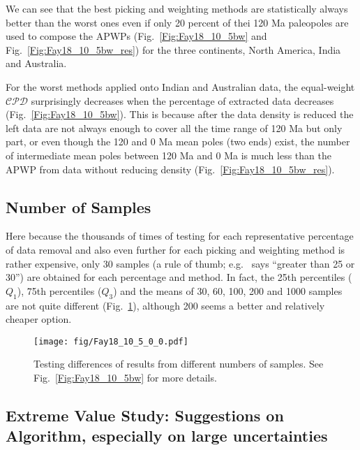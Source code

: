 We can see that the best picking and weighting methods are statistically always
better than the worst ones even if only 20 percent of thei 120 Ma
paleopoles are used to compose the APWPs (Fig.~\ref{Fig:Fay18_10_5bw} and
Fig.~\ref{Fig:Fay18_10_5bw_res}) for the three continents, North America, India
and Australia.

For the worst methods applied onto Indian and Australian data, the equal-weight
$\mathcal{CPD}$ surprisingly decreases when the percentage of extracted data
decreases (Fig.~\ref{Fig:Fay18_10_5bw}). This is because after the data density
is reduced the left data are not always enough to cover all the time range of
120 Ma but only part, or even though the 120 and 0 Ma mean poles
(two ends) exist, the number of intermediate mean poles between 120 Ma and 0 Ma
is much less than the APWP from data without reducing density
(Fig.~\ref{Fig:Fay18_10_5bw_res}).

\subsection{Number of Samples}
Here because the thousands of times of testing for each representative
percentage of data removal and also even further for each picking and weighting
method is rather expensive, only 30 samples (a rule of thumb; e.g.~\cite{H19}
says ``greater than 25 or 30'') are obtained for each percentage and method. In
fact, the 25th percentiles ($Q_1$), 75th percentiles ($Q_3$) and the means of
30, 60, 100, 200 and 1000 samples are not quite different
(Fig.~\ref{Fig:Fay18_10_5_0_0}), although 200 seems a better and relatively
cheaper option.

\begin{figure}
    \centering
        \texttt{[image: fig/Fay18\_10\_5\_0\_0.pdf]}
    \captionsetup{width=.95\textwidth}
    \caption{Testing differences of results from different numbers of samples.
	See Fig.~\ref{Fig:Fay18_10_5bw} for more details.}\label{Fig:Fay18_10_5_0_0}
\end{figure}


\subsection{Extreme Value Study: Suggestions on Algorithm, especially on large
uncertainties}


